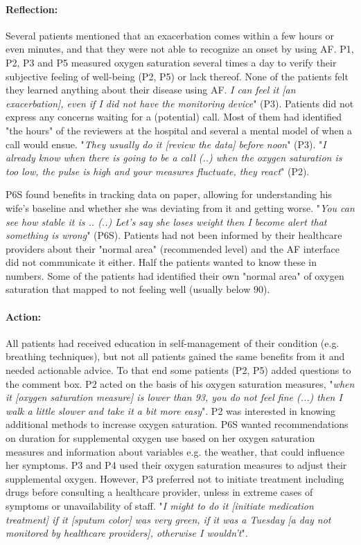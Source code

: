 \paragraph{Reflection:} 
Several patients mentioned that an exacerbation comes within a few hours or even minutes, and that they were not able to recognize an onset by using AF. P1, P2, P3 and P5 measured oxygen saturation several times a day to verify their subjective feeling of well-being (P2, P5) or lack thereof. None of the patients felt they learned anything about their disease using AF. \textit{I can feel it [an exacerbation], even if I did not have the monitoring device}" (P3). Patients did not express any concerns waiting for a (potential) call. Most of them had identified "the hours" of the reviewers at the hospital and several a mental model of when a call would ensue. "\textit{They usually do it [review the data] before noon}" (P3). "\textit{I already know when there is going to be a call (..) when the oxygen saturation is too low, the pulse is high and your measures fluctuate, they react}" (P2). 

P6S found benefits in tracking data on paper, allowing for understanding his wife's baseline and whether she was deviating from it and getting worse. "\textit{You can see how stable it is .. (..) Let's say she loses weight then I become alert that something is wrong}" (P6S). Patients had not been informed by their healthcare providers about their "normal area" (recommended level) and the AF interface did not communicate it either. Half the patients wanted to know these in numbers. Some of the patients had identified their own "normal area" of oxygen saturation that mapped to not feeling well (usually below 90). 

\paragraph{Action:} 
All patients had received education in self-management of their condition (e.g. breathing techniques), but not all patients gained the same benefits from it and needed actionable advice. To that end some patients (P2, P5) added questions to the comment box. P2 acted on the basis of his oxygen saturation measures, "\textit{when it [oxygen saturation measure] is lower than 93, you do not feel fine (...) then I walk a little slower and take it a bit more easy}". P2 was interested in knowing additional methods to increase oxygen saturation. P6S wanted recommendations on duration for supplemental oxygen use based on her oxygen saturation measures and information about variables e.g. the weather, that could influence her symptoms. P3 and P4 used their oxygen saturation measures to adjust their supplemental oxygen. However, P3 preferred not to initiate treatment including drugs before consulting a healthcare provider, unless in extreme cases of symptoms or unavailability of staff. "\textit{I might to do it [initiate medication treatment] if it [sputum color] was very green, if it was a Tuesday [a day not monitored by healthcare providers], otherwise I wouldn't}".

